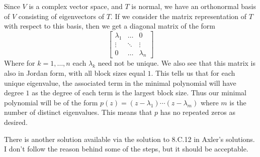 \documentclass[answers]{exam}
\begin{document}
\begin{questions}
\begin{solution}
        Since $V$ is a complex vector space, and $T$ is normal, we have an orthonormal basis of $V$ consisting of
        eigenvectors of $T$. If we consider the matrix representation of $T$ with respect to this basis, then
        we get a diagonal matrix of the form
        \[
            \begin{bmatrix}
                \lambda_1 & \dots&0\\
                \vdots & \ddots & \vdots \\
                0 & \dots & \lambda_n
            \end{bmatrix}
        \]
        Where for $k=1,\dots,n$ each $\lambda_k$ need not be unique. We also see that this matrix is also in 
        Jordan form, with all block sizes equal $1$. This tells us that for each unique eigenvalue, the associated
        term in the minimal polynomial will have degree $1$ as the degree of each term is the largest block size.
        Thus our minimal polynomial will be of the form
        $p(z) = (z-\lambda_1)\cdots(z-\lambda_m)$ where $m$ is the number of distinct eigenvalues. This means that
        $p$ has no repeated zeros as desired.

        There is another solution available via the solution to 8.C.12 in Axler's solutions. I don't follow the
        reason behind some of the steps, but it should be acceptable.
    \end{solution}
\end{questions}
\end{document}
